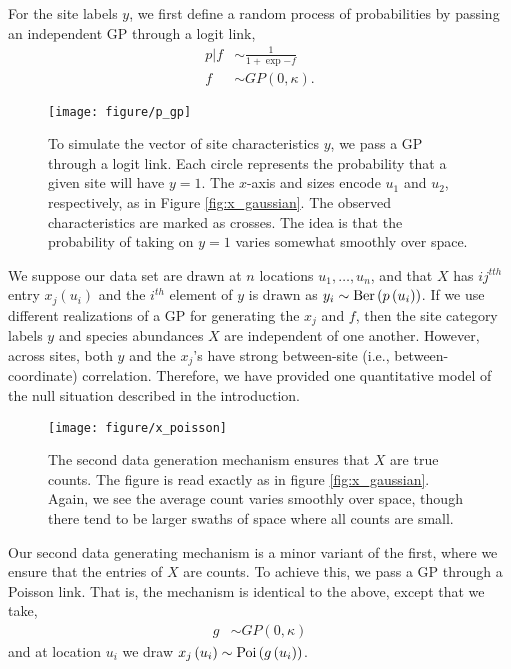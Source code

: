 \documentclass{article}
\begin{document}
For the site labels $y$, we first define a random process of probabilities by
passing an independent GP through a logit link,
\begin{align}
  p \vert f &\sim \frac{1}{1 + \exp{-f}} \\
  f &\sim GP\left(0, \kappa\right).
\end{align}

\begin{figure}[ht]
  \centering
  \texttt{[image: figure/p\_gp]}
  \caption{\label{fig:p_gp} To simulate the vector of site characteristics $y$,
    we pass a GP through a logit link. Each circle represents the probability
    that a given site will have $y = 1$. The $x$-axis and sizes encode $u_{1}$
    and $u_{2}$, respectively, as in Figure \ref{fig:x_gaussian}. The observed
    characteristics are marked as crosses. The idea is that the probability of
    taking on $y = 1$ varies somewhat smoothly over space.}
\end{figure}

We suppose our data set are drawn at $n$ locations $u_{1}, \dots, u_{n}$, and
that $X$ has $ij^{tth}$ entry $x_{j}\left(u_{i}\right)$ and the $i^{th}$ element
of $y$ is drawn as $y_{i} \sim \textnormal{Ber}\left(p\left(u_{i}\right)\right)$. If we use
different realizations of a GP for generating the $x_{j}$ and $f$, then the site
category labels $y$ and species abundances $X$ are independent of one another.
However, across sites, both $y$ and the $x_{j}$'s have strong between-site
(i.e., between-coordinate) correlation. Therefore, we have provided one
quantitative model of the null situation described in the introduction.

\begin{figure}
  \centering
  \texttt{[image: figure/x\_poisson]}
  \caption{\label{fig:x_poisson} The second data generation mechanism ensures
    that $X$ are true counts. The figure is read exactly as in figure
    \ref{fig:x_gaussian}. Again, we see the average count varies smoothly over
    space, though there tend to be larger swaths of space where all counts are
    small.}
\end{figure}

Our second data generating mechanism is a minor variant of the first, where
we ensure that the entries of $X$ are counts. To achieve this, we pass a GP
through a Poisson link. That is, the mechanism is identical to the above,
except that we take,
\begin{align}
  g &\sim GP\left(0, \kappa\right)
\end{align}
and at location $u_{i}$ we draw
$x_{j}\left(u_{i}\right) \sim \textnormal{Poi}\left(g\left(u_{i}\right)\right)$.
\end{document}
